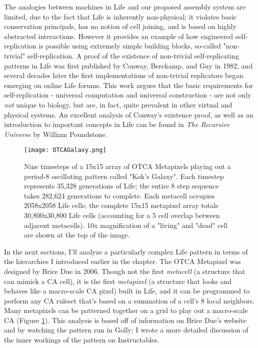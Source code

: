 {The analogies between machines in Life and our proposed assembly system are limited, due to the fact that Life is inherently non-physical; it violates basic conservation principals, has no notion of cell joining, and is based on highly abstracted interactions.  However it provides an example of how engineered self-replication is possible using extremely simple building blocks, so-called "non-trivial" self-replication.  A proof of the existence of non-trivial self-replicating patterns in Life was first published by Conway, Berekamp, and Guy in 1982\cite{Berekamp1982}, and several decades later the first implementations of non-trivial replicators began emerging on online Life forums\cite{Greene2013a}.  This work argues that the basic requirements for self-replication - universal computation and universal construction - are not only \textit{not} unique to biology, but are, in fact, quite prevalent in other virtual and physical systems.  An excellent analysis of Conway's existence proof, as well as an introduction to important concepts in Life can be found in \textit{The Recursive Universe} by William Poundstone\cite{Poundstone1985}.\\

\begin{figure}
  \texttt{[image: OTCAGalaxy.png]}
  \caption{Nine timesteps of a 15x15 array of OTCA Metapixels playing out a period-8 oscillating pattern called "Kok's Galaxy".  Each timestep represents 35,328 generations of Life; the entire 8 step sequence takes 282,624 generations to complete.  Each metacell occupies 2058x2058 Life cells; the complete 15x15 metapixel array totals 30,800x30,800 Life cells (accounting for a 5 cell overlap between adjacent metacells).  10x magnification of a "living" and "dead" cell are shown at the top of the image.}
  \label{fig:OTCAGalaxy}
\end{figure}

In the next sections, I'll analyze a particularly complex Life pattern in terms of the hierarchies I introduced earlier in the chapter.  The OTCA Metapixel was designed by Brice Due in 2006.  Though not the first \textit{metacell} (a structure that can mimick a CA cell), it is the first \textit{metapixel} (a structure that looks and behaves like a macro-scale CA pixel) built in Life, and it can be programmed to perform any CA ruleset that's based on a summation of a cell's 8 local neighbors.  Many metapixels can be patterned together on a grid to play out a macro-scale CA (Figure \ref{fig:OTCAGalaxy}).  This analysis is based off of information on Brice Due's website\cite{Due2006} and by watching the pattern run in Golly; I wrote a more detailed discussion of the inner workings of the pattern on Instructables\cite{Ghassaei2015}.

}
